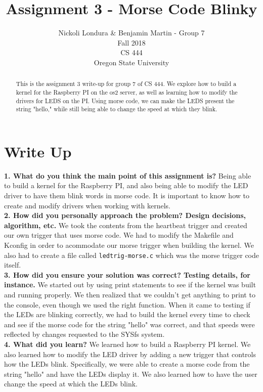 \documentclass[10pt,english]{article}
\title{Assignment 3 - Morse Code Blinky}
\author{Nickoli Londura \& Benjamin Martin - Group 7 \\ Fall 2018 \\ CS 444 \\ Oregon State University}
\begin{document}
\maketitle

\begin{abstract}

\noindent This is the assignment 3 write-up for group 7 of CS 444. We explore how to build a kernel for the Raspberry PI on the os2 server, as well as learning how to modify the drivers for LEDS on the PI. Using morse code, we can make the LEDS present the string "hello," while still being able to change the speed at which they blink.

\end{abstract}

\newpage

\section{Write Up}

\textbf{1. What do you think the main point of this assignment is?}
Being able to build a kernel for the Raspberry PI, and also being able to modify the LED driver to have them blink words in morse code. It is important to know how to create and modify drivers when working with kernels. \\

\noindent \textbf{2. How did you personally approach the problem? Design decisions, algorithm, etc.}
We took the contents from the heartbeat trigger and created our own trigger that uses morse code. We had to modify the Makefile and Kconfig in order to acommodate our morse trigger when building the kernel. We also had to create a file called \verb|ledtrig-morse.c| which was the morse trigger code itself.\\


\noindent \textbf{3. How did you ensure your solution was correct? Testing details, for instance.}
We started out by using print statements to see if the kernel was built and running properly. We then realized that we couldn't get anything to print to the console, even though we used the right function. When it came to testing if the LEDs are blinking correctly, we had to build the kernel every time to check and see if the morse code for the string "hello" was correct, and that speeds were reflected by changes requested to the SYSfs system.\\


\noindent \textbf{4. What did you learn?}
We learned how to build a Raspberry PI kernel. We also learned how to modify the LED driver by adding a new trigger that controls how the LEDs blink. Specifically, we were able to create a morse code from the string "hello" and have the LEDs display it. We also learned how to have the user change the speed at which the LEDs blink. \\
\end{document}
